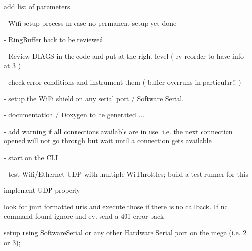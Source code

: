 
\begin{DoxyRefList}
\item[Member \mbox{\hyperlink{class_http_request_a42b01e8d23e15e65ad9c712922a6a812}{Http\+Request\+::Http\+Request}} ()]\label{todo__todo000001}%
%
add list of parameters 
\item[" ]\label{todo__todo000002}%
%
-\/ Wifi setup process in case no permanent setup yet done 

-\/ Ring\+Buffer hack to be reviewed 

-\/ Review D\+I\+A\+GS in the code and put at the right level ( ev reorder to have info at 3 ) 

-\/ check error conditions and instrument them ( buffer overruns in particular!! ) 

-\/ setup the Wi\+Fi \textquotesingle{}shield\textquotesingle{} on any serial port / Software Serial. 

-\/ documentation / Doxygen to be generated ... 

-\/ add warning if all connections available are in use. i.\+e. the next connection opened will not go through but wait until a connection gets available 

-\/ start on the C\+LI 

\label{todo__todo000003}%
%
-\/ test Wifi/\+Ethernet U\+DP with multiple Wi\+Throttles; build a test runner for this 

\label{todo__todo000004}%
%
implement U\+DP properly 
\item[Member \mbox{\hyperlink{_transport_processor_8cpp_adffd99c797adf573a9d65073d1595d53}{http\+Processor}} (\mbox{\hyperlink{struct_connection}{Connection}} $\ast$c, \mbox{\hyperlink{class_transport_processor}{Transport\+Processor}} $\ast$t)]\label{todo__todo000005}%
%
look for jmri formatted uris and execute those if there is no callback. If no command found ignore and ev. send a 401 error back  
\item[Member \mbox{\hyperlink{class_wifi_setup_a63c1e8056faee13a274a941c59549907}{Wifi\+Setup\+::setup}} ()]\label{todo__todo000006}%
%
setup using Software\+Serial or any other Hardware Serial port on the mega (i.\+e. 2 or 3);
\end{DoxyRefList}